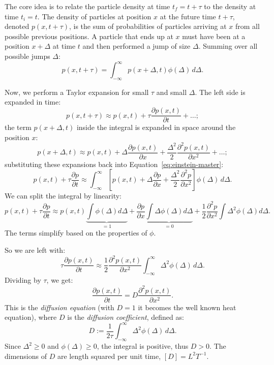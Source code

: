 The core idea is to relate the particle density at time $t_f = t+\tau$ to the density at time $t_i = t$. The density of particles at position $x$ at the future time $t+\tau$, denoted $p(x, t+\tau)$, is the sum of probabilities of particles arriving at $x$ from all possible previous positions. A particle that ends up at $x$ must have been at a position $x+\Delta$ at time $t$ and then performed a jump of size $\Delta$. Summing over all possible jumps $\Delta$:
\begin{equation}\label{eq:einstein-master}
p(x, t+\tau) = \int_{-\infty}^{\infty} p(x+\Delta, t) \phi(\Delta) \,d\Delta.
\end{equation}

Now, we perform a Taylor expansion for small $\tau$ and small $\Delta$. The left side is expanded in time:
\begin{equation}
p(x, t+\tau) \approx p(x,t) + \tau \frac{\partial p(x,t)}{\partial t} + \dots;
\end{equation}
the term $p(x+\Delta, t)$ inside the integral is expanded in space around the position $x$:
\begin{equation}
p(x+\Delta, t) \approx p(x,t) + \Delta \frac{\partial p(x,t)}{\partial x} + \frac{\Delta^2}{2} \frac{\partial^2 p(x,t)}{\partial x^2} + \dots;
\end{equation}
substituting these expansions back into Equation~\eqref{eq:einstein-master}:
\begin{equation}
p(x,t) + \tau \frac{\partial p}{\partial t} \approx \int_{-\infty}^{\infty} \left[ p(x,t) + \Delta \frac{\partial p}{\partial x} + \frac{\Delta^2}{2} \frac{\partial^2 p}{\partial x^2} \right] \phi(\Delta) \,d\Delta.
\end{equation}
We can split the integral by linearity:
\begin{equation}
p(x,t) + \tau \frac{\partial p}{\partial t} \approx p(x,t) \underbrace{\int \phi(\Delta)d\Delta}_{=1} + \frac{\partial p}{\partial x} \underbrace{\int \Delta \phi(\Delta)d\Delta}_{=0} + \frac{1}{2}\frac{\partial^2 p}{\partial x^2} \int \Delta^2 \phi(\Delta)d\Delta.
\end{equation}
The terms simplify based on the properties of $\phi$.

So we are left with:
\begin{equation}
\tau \frac{\partial p(x,t)}{\partial t} \approx \frac{1}{2}\frac{\partial^2 p(x,t)}{\partial x^2} \int_{-\infty}^{\infty} \Delta^2 \phi(\Delta) \,d\Delta.
\end{equation}
Dividing by $\tau$, we get:
\begin{equation}
\frac{\partial p(x,t)}{\partial t} = D \frac{\partial^2 p(x,t)}{\partial x^2}.
\end{equation}
This is the \emph{diffusion equation} (with $D=1$ it becomes the well known heat equation), where $D$ is the \emph{diffusion coefficient}, defined as:
\begin{equation}
D := \frac{1}{2\tau} \int_{-\infty}^{\infty} \Delta^2 \phi(\Delta) \,d\Delta.
\end{equation}
Since $\Delta^2 \ge 0$ and $\phi(\Delta) \ge 0$, the integral is positive, thus $D>0$. The dimensions of $D$ are length squared per unit time, $[D] = L^2 T^{-1}$.


